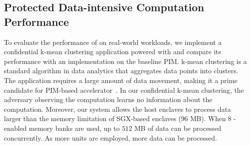 \subsection{Protected Data-intensive Computation Performance}
 
\label{subsec:app-perf}
\label{subsec:kmean}
% 


To evaluate the performance of \thename on real-world workloads, we implement a confidential k-mean clustering application powered with \thename and compare its performance with an implementation on the baseline PIM. 
k-mean clustering is a standard algorithm in data analytics that aggregates data points into clusters. The application requires a large amount of data movement, making it a prime candidate for PIM-based accelerator~\cite{dual,prins}. 
In our confidential k-mean clustering, the adversary observing the computation learns no information about the computation. Moreover, our system allows the host enclaves to process data larger than the memory limitation of SGX-based enclaves ($96$ MB). When 8 \thename-enabled memory banks are used, up to $512$ MB of data can be processed concurrently. As more \thename units are employed, more data can be processed. 






